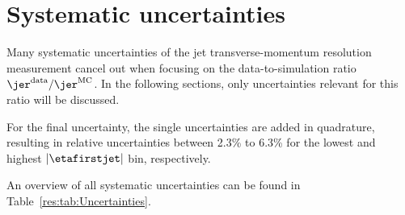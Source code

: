 \chapter{Systematic uncertainties}

Many systematic uncertainties of the jet transverse-momentum resolution measurement cancel out when focusing on the data-to-simulation ratio $\jer^{\text{data}}/\jer^{\text{MC}}$.
In the following sections, only uncertainties relevant for this ratio will be discussed.

For the final uncertainty, the single uncertainties are added in quadrature, resulting in relative uncertainties between 2.3\% to 6.3\% for the lowest and highest $|\etafirstjet|$ bin, respectively. 

An overview of all systematic uncertainties can be found in Table~\ref{res:tab:Uncertainties}.

